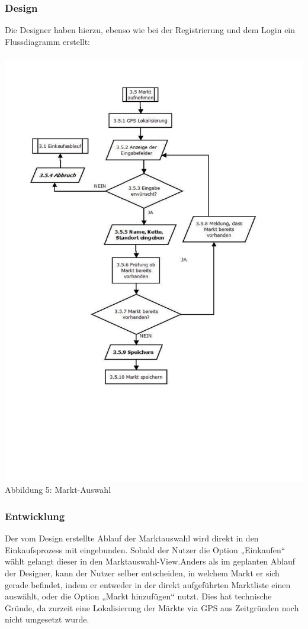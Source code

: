 \documentclass[12pt,a4paper]{article}
\begin{document}
\subsubsection*{Design}
Die Designer haben hierzu, ebenso wie bei der Registrierung und dem Login ein Flussdiagramm erstellt: 
\\
\\
\hspace*{-10mm} 
\includegraphics[trim = 17mm 40mm 0mm 20mm, clip, scale=0.9]{Markt-Aufnahme.pdf}
\\
\footnotesize Abbildung 5: Markt-Auswahl
\normalsize
\subsubsection*{Entwicklung}
Der vom Design erstellte Ablauf der Marktauswahl wird direkt in den Einkaufsprozess mit eingebunden. Sobald der Nutzer die Option „Einkaufen“ wählt gelangt dieser in den Marktauswahl-View.Anders als im geplanten Ablauf der Designer, kann der Nutzer selber entscheiden, in welchem Markt er sich gerade befindet, indem er entweder in der direkt aufgeführten Marktliste einen auswählt, oder die Option „Markt hinzufügen“ nutzt. Dies hat technische Gründe, da zurzeit eine Lokalisierung der Märkte via GPS aus Zeitgründen noch nicht umgesetzt wurde.
\newpage
\end{document}
